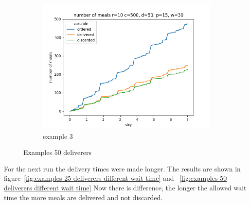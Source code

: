\begin{center}
\begin{figure}
\begin{subfigure}[m]{0.30\textwidth}
        \end{subfigure}
        \hfill
        \begin{subfigure}[m]{0.30\textwidth}
            \centering
            \includegraphics[width=\textwidth]{sections/run2/week_nd_3_food_ordering_distribution_500_10_50_30}
            \caption{example 3}
        \end{subfigure}
        \caption{Examples 50 deliverers}
        \label{fig:examples 50 deliverers}
    \end{figure}
\end{center}

For the next run the delivery times were made longer.
The results are shown in figure~\ref{fig:examples 25 deliverers different wait time} and ~\ref{fig:examples 50 deliverers different wait time}
Now there is difference, the longer the allowed wait time the more meals are delivered and not discarded.

